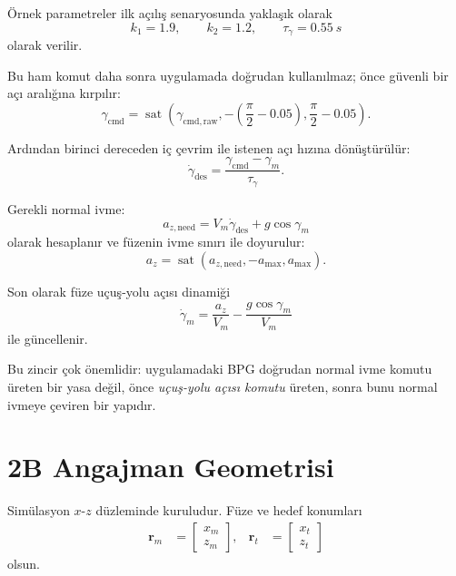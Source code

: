 \documentclass[11pt,a4paper]{article}
\begin{document}
Örnek parametreler ilk açılış senaryosunda yaklaşık olarak
\begin{equation}
k_1 = 1.9, \qquad k_2 = 1.2, \qquad \tau_\gamma = 0.55 \ \si{s}
\end{equation}
olarak verilir.

Bu ham komut daha sonra uygulamada doğrudan kullanılmaz; önce güvenli bir açı aralığına kırpılır:
\begin{equation}
\gamma_{\mathrm{cmd}}
=
\operatorname{sat}\!\left(
\gamma_{\mathrm{cmd,raw}},
-
\left(\frac{\pi}{2}-0.05\right),
\frac{\pi}{2}-0.05
\right).
\label{eq:gamma_sat}
\end{equation}

Ardından birinci dereceden iç çevrim ile istenen açı hızına dönüştürülür:
\begin{equation}
\dot{\gamma}_{\mathrm{des}}
=
\frac{\gamma_{\mathrm{cmd}} - \gamma_m}{\tau_\gamma}.
\label{eq:gammadot_des}
\end{equation}

Gerekli normal ivme:
\begin{equation}
a_{z,\mathrm{need}}
=
V_m \dot{\gamma}_{\mathrm{des}} + g\cos\gamma_m
\label{eq:az_need}
\end{equation}
olarak hesaplanır ve füzenin ivme sınırı ile doyurulur:
\begin{equation}
a_z = \operatorname{sat}\!\left(a_{z,\mathrm{need}},-a_{\max},a_{\max}\right).
\label{eq:az_sat}
\end{equation}

Son olarak füze uçuş-yolu açısı dinamiği
\begin{equation}
\dot{\gamma}_m
=
\frac{a_z}{V_m} - \frac{g\cos\gamma_m}{V_m}
\label{eq:gamma_dyn}
\end{equation}
ile güncellenir.

Bu zincir çok önemlidir: uygulamadaki BPG doğrudan normal ivme komutu üreten bir yasa değil, önce \emph{uçuş-yolu açısı komutu} üreten, sonra bunu normal ivmeye çeviren bir yapıdır.

\section{2B Angajman Geometrisi}

Simülasyon \(x\)-\(z\) düzleminde kuruludur. Füze ve hedef konumları
\begin{align}
\bm{r}_m &= \begin{bmatrix}x_m \\ z_m\end{bmatrix},
&
\bm{r}_t &= \begin{bmatrix}x_t \\ z_t\end{bmatrix}
\end{align}
olsun.
\end{document}
